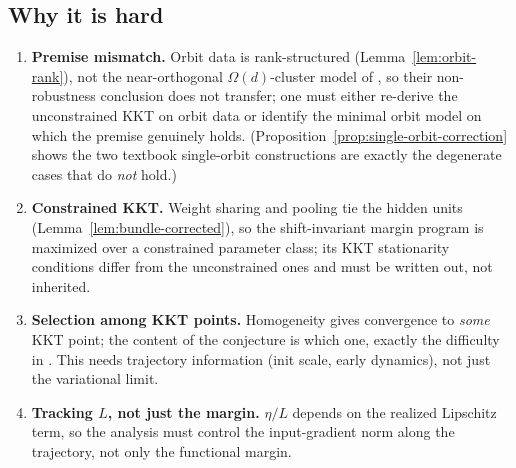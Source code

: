 \documentclass[11pt]{article}
\theoremstyle{plain}
\theoremstyle{definition}
\theoremstyle{remark}
\begin{document}
\subsection{Why it is hard}
\begin{enumerate}[leftmargin=1.4em]
\item \textbf{Premise mismatch.}  Orbit data is rank-structured (Lemma~\ref{lem:orbit-rank}), not the near-orthogonal $\Omega(d)$-cluster model of \citet{Frei2023,LiFeature2024}, so their non-robustness conclusion does not transfer; one must either re-derive the unconstrained KKT on orbit data or identify the minimal orbit model on which the premise genuinely holds.  (Proposition~\ref{prop:single-orbit-correction} shows the two textbook single-orbit constructions are exactly the degenerate cases that do \emph{not} hold.)
\item \textbf{Constrained KKT.}  Weight sharing and pooling tie the hidden units (Lemma~\ref{lem:bundle-corrected}), so the shift-invariant margin program is maximized over a constrained parameter class; its KKT stationarity conditions differ from the unconstrained ones and must be written out, not inherited.
\item \textbf{Selection among KKT points.}  Homogeneity gives convergence to \emph{some} KKT point; the content of the conjecture is which one, exactly the difficulty in \citet{Frei2023}.  This needs trajectory information (init scale, early dynamics), not just the variational limit.
\item \textbf{Tracking $L$, not just the margin.}  $\eta/L$ depends on the realized Lipschitz term, so the analysis must control the input-gradient norm along the trajectory, not only the functional margin.
\end{enumerate}
\end{document}
